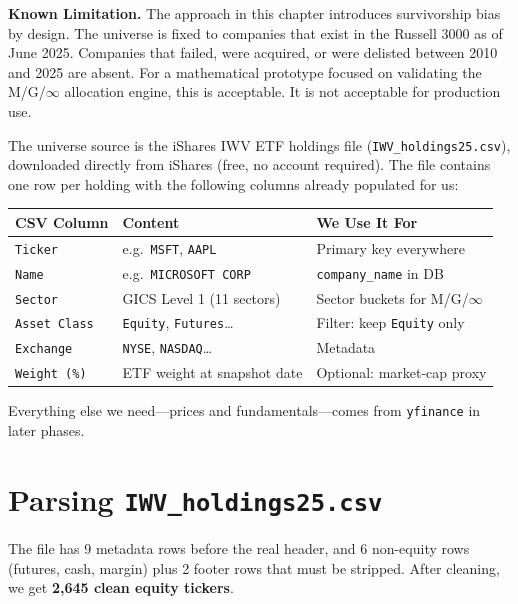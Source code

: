 \documentclass[11pt, oneside]{book}
\begin{document}
\begin{warningbox}
\textbf{Known Limitation.} The approach in this chapter introduces survivorship bias by design. The universe is fixed to companies that exist in the Russell 3000 as of June 2025. Companies that failed, were acquired, or were delisted between 2010 and 2025 are absent. For a mathematical prototype focused on validating the M/G/$\infty$ allocation engine, this is acceptable. It is not acceptable for production use.
\end{warningbox}

The universe source is the iShares IWV ETF holdings file (\texttt{IWV\_holdings25.csv}), downloaded directly from iShares (free, no account required). The file contains one row per holding with the following columns already populated for us:

\begin{center}
\begin{tabular}{lll}
\toprule
\textbf{CSV Column} & \textbf{Content} & \textbf{We Use It For} \\
\midrule
\texttt{Ticker}     & e.g.\ \texttt{MSFT}, \texttt{AAPL} & Primary key everywhere \\
\texttt{Name}       & e.g.\ \texttt{MICROSOFT CORP}       & \texttt{company\_name} in DB \\
\texttt{Sector}     & GICS Level 1 (11 sectors)           & Sector buckets for M/G/$\infty$ \\
\texttt{Asset Class}& \texttt{Equity}, \texttt{Futures}\ldots & Filter: keep \texttt{Equity} only \\
\texttt{Exchange}   & \texttt{NYSE}, \texttt{NASDAQ}\ldots & Metadata \\
\texttt{Weight (\%)}& ETF weight at snapshot date         & Optional: market-cap proxy \\
\bottomrule
\end{tabular}
\end{center}

Everything else we need---prices and fundamentals---comes from \texttt{yfinance} in later phases.

\section{Parsing \texttt{IWV\_holdings25.csv}}

The file has 9 metadata rows before the real header, and 6 non-equity rows (futures, cash, margin) plus 2 footer rows that must be stripped. After cleaning, we get \textbf{2,645 clean equity tickers}.
\end{document}
